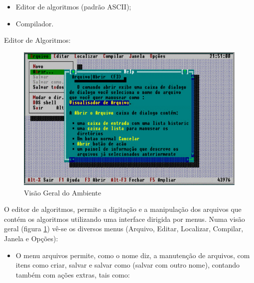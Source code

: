 \begin{itemize}
  \setlength\itemsep{0em}
  \item Editor de algoritmos (padrão ASCII);
  \item Compilador.
\end{itemize}

\begin{enumerate}
  {\bfseries\item Editor de Algoritmos:}

  \begin{figure}[h]
    \centering
    \includegraphics{figures/portugolplus-ambiente.pdf}
    \caption{Visão Geral do Ambiente}\label{fig:portugolplus-ambiente}
  \end{figure}

O editor de algoritmos, permite a digitação e a manipulação dos arquivos que
contém os algoritmos utilizando uma interface dirigida por menus. Numa visão
geral (figura \ref{fig:portugolplus-ambiente}) vê-se os diversos menus (Arquivo,
Editar, Localizar, Compilar, Janela e Opções):

\begin{itemize}

  \item O menu arquivos permite, como o nome diz, a manutenção de arquivos, com
  itens como criar, salvar e salvar como (salvar com outro nome), contando também
  com ações extras, tais como:

\begin{itemize}


\end{itemize}
\end{itemize}
\end{enumerate}
